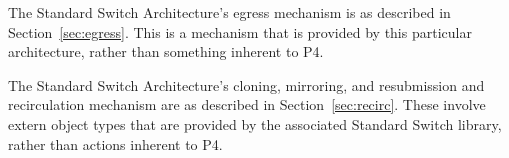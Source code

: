The Standard Switch Architecture's egress mechanism is as described
in Section~\ref{sec:egress}.  This is a mechanism that is provided by
this particular architecture, rather than something inherent to P4.


The Standard Switch Architecture's cloning, mirroring, and resubmission
and recirculation mechanism are as described in Section~\ref{sec:recirc}.
These involve extern object types that are provided by the associated
Standard Switch library, rather than actions inherent to P4.